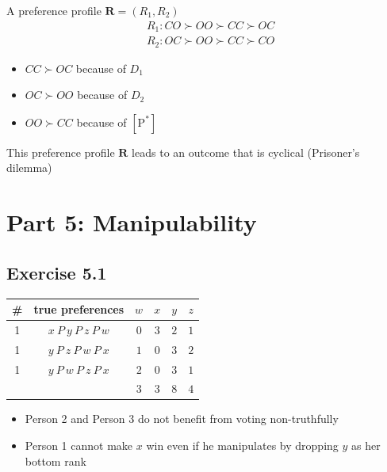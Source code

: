 \documentclass[a4paper]{article}
\begin{document}
A preference profile $\mathbf{R}=(R_1, R_2)$
\begin{align*}
    & R_1: CO \succ OO \succ CC \succ OC \\
    & R_2: OC \succ OO \succ CC \succ CO
\end{align*}

\begin{itemize}
    \item $CC \succ OC$ because of $D_1$
    \item $OC \succ OO$ because of $D_2$
    \item $OO \succ CC$ because of $[\text{P}^*]$
\end{itemize}

This preference profile $\mathbf{R}$ leads to an outcome that is cyclical (Prisoner's dilemma)

\section*{Part 5: Manipulability}

\subsection*{Exercise 5.1}

\begin{table}[!htbp]
    \centering
    \begin{tabular}{c|c|cccc|}
        \# & true preferences             & $w$  & $x$  & $y$  & $z$ \\ 
        \hline
        1  & $x\: P\: y\: P\: z\: P\: w$  & $0$  & $3$  & $2$  & $1$ \\
        1  & $y\: P\: z\: P\: w\: P\: x$  & $1$  & $0$  & $3$  & $2$ \\
        1  & $y\: P\: w\: P\: z\: P\: x$  & $2$  & $0$  & $3$  & $1$ \\
        \hline
           &                              & $3$ & $3$  & $8$  & $4$ \\
        \hline
    \end{tabular}
\end{table}

\begin{itemize}
    \item Person 2 and Person 3 do not benefit from voting non-truthfully
    \item Person 1 cannot make $x$ win even if he manipulates by dropping $y$ as her bottom rank
\end{itemize}
\end{document}

